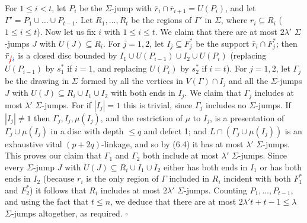 For $1 \le i < t$, let $P_i$ be the $\Sigma$-jump with $\bar{r}_i \cap \bar{r}_{i+1} = U(P_i)$, and let $\Gamma' = P_1 \cup \ldots \cup P_{t-1}$. Let $R_1, \ldots, R_t$ be the regions of $\Gamma'$ in $\Sigma$, where $r_i \subseteq R_i$ ($1 \le i \le t$). Now let us fix $i$ with $1 \le i \le t$. We claim that there are at most $2\lambda'$ $\Sigma$-jumps $J$ with $U(J) \subseteq R_i$. For $j = 1, 2$, let $I_j \subseteq F_j^*$ be the support $\bar{r}_i \cap F_j^*$; then $\bar{r}_{\delm{j}\fix{i}}$ is a closed disc bounded by $I_1 \cup U(P_{i-1}) \cup I_2 \cup U(P_i)$ (replacing $U(P_{i-1})$ by $s_1^*$ if $i = 1$, and replacing $U(P_i)$ by $s_2^*$ if $i = t$). For $j = 1, 2$, let $\Gamma_j$ be the drawing in $\Sigma$ formed by all the vertices in $V(\Gamma) \cap I_j$ and all the $\Sigma$-jumps $J$ with $U(J) \subseteq R_i \cup I_1 \cup I_2$ with both ends in $I_j$. We claim that $\Gamma_j$ includes at most $\lambda'$ $\Sigma$-jumps. For if $|I_j| = 1$ this is trivial, since $\Gamma_j$ includes no $\Sigma$-jumps. If $|I_j| \ne 1$ then $\Gamma_j, I_j, \mu(I_j)$, and the restriction of $\mu$ to $I_j$, is a presentation of $\Gamma_j \cup \mu(I_j)$ in a disc with depth $\le q$ and defect 1; and $L \cap (\Gamma_j \cup \mu(I_j))$ is an exhaustive vital $(p+2q)$-linkage, and so by (6.4) it has at most $\lambda'$ $\Sigma$-jumps. This proves our claim that $\Gamma_1$ and $\Gamma_2$ both include at most $\lambda'$ $\Sigma$-jumps. Since every $\Sigma$-jump $J$ with $U(J) \subseteq R_i \cup I_1 \cup I_2$ either has both ends in $I_1$ or has both ends in $I_2$ (because $r_i$ is the only region of $\Gamma$ included in $R_i$ incident with both $F_1^*$ and $F_2^*$) it follows that $R_i$ includes at most $2\lambda'$ $\Sigma$-jumps. Counting $P_1, \ldots, P_{t-1}$, and using the fact that $t \le n$, we deduce that there are at most $2\lambda't + t - 1 \le \lambda$ $\Sigma$-jumps altogether, as required. $\square$
